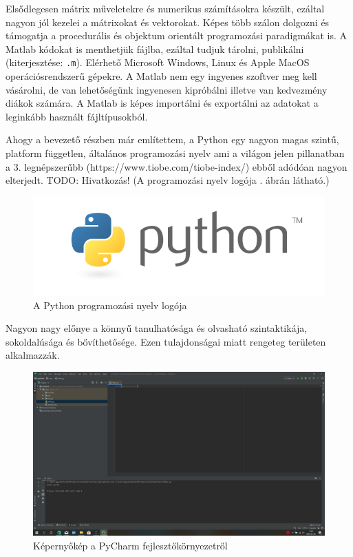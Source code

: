 Elsődlegesen mátrix műveletekre és numerikus számításokra készült,
ezáltal nagyon jól kezelei a mátrixokat és vektorokat.
Képes több szálon dolgozni és
támogatja a procedurális és objektum orientált programozási paradigmákat
is. A Matlab kódokat is menthetjük fájlba, ezáltal tudjuk tárolni,
publikálni (kiterjesztése: \texttt{.m}). Elérhető Microsoft Windows, Linux és
Apple MacOS operációsrendszerű gépekre. A Matlab nem egy ingyenes
szoftver meg kell vásárolni, de van lehetőségünk ingyenesen kipróbálni
illetve van kedvezmény diákok számára. A Matlab is képes importálni és
exportálni az adatokat a leginkább használt fájltípusokból.


Ahogy a bevezető részben már említettem, a Python egy nagyon magas
szintű, platform független, általános programozási nyelv ami a világon
jelen pillanatban a 3. legnépszerűbb
(https://www.tiobe.com/tiobe-index/) ebből adódóan nagyon elterjedt.
TODO: Hivatkozás! %
(A programozási nyelv logója . ábrán látható.)

\begin{figure}
\centering
\includegraphics[width=\textwidth]{img/python-logo.png}
\caption{A Python programozási nyelv logója}
\label{fig:python-logo}
\end{figure}

Nagyon nagy előnye a könnyű tanulhatósága és olvasható szintaktikája,
sokoldalúsága és bővíthetősége. Ezen tulajdonságai miatt rengeteg
területen alkalmazzák.

\begin{figure}
\centering
\includegraphics[width=\textwidth]{img/Python_screenshot.png}
\caption{Képernyőkép a PyCharm fejlesztőkörnyezetről}
\label{fig:pycharm}
\end{figure}


